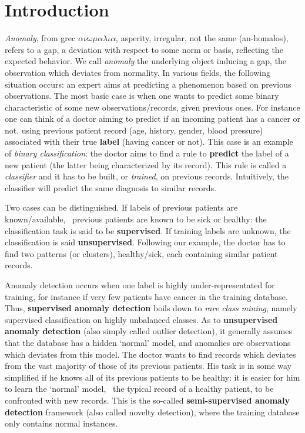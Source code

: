 
\section{Introduction}
\emph{Anomaly}, from grec $\alpha\nu\omega\mu\alpha\lambda\iota\alpha$, asperity, irregular, not the same (an-homalos), refers to a gap, a deviation with respect to some norm or basis, reflecting the expected behavior.
We call \emph{anomaly} the underlying object inducing a gap, the observation which deviates from normality. 
%
In various fields, the following situation occurs: an expert aims at predicting a phenomenon based on previous observations. The most basic case is when one wants to predict some binary characteristic of some new observations/records, given previous ones. For instance one can think of a doctor aiming to predict if an incoming patient has a cancer or not, using previous patient record (age, history, gender, blood pressure) associated with their true \textbf{label} (having cancer or not). This case is an example of \emph{binary classification}: the doctor aims to find a rule to \textbf{predict} the label of a new patient (the latter being characterized by its record). This rule is called a \emph{classifier} and it has to be built, or \emph{trained}, on previous records. %
Intuitively, the classifier will predict the same diagnosis to similar records. 

Two cases can be distinguished. If labels of previous patients are known/available, \ie~previous patients are known to be sick or healthy: the classification task is said to be \textbf{supervised}. If training labels are unknown, the classification is said \textbf{unsupervised}. Following our example, the doctor has to find two patterns (or clusters), healthy/sick, each containing similar patient records.

Anomaly detection occurs when one label is highly under-representated for training, for instance if very few patients have cancer in the training database.
Thus, \textbf{supervised anomaly detection} boils down to \emph{rare class mining}, namely supervised classification on highly unbalanced classes. 
As to \textbf{unsupervised anomaly detection} (also simply called outlier detection), it generally assumes that the database has a hidden `normal' model, and anomalies are observations which deviates from this model. The doctor wants to find records which deviates from the vast majority of those of its previous patients. 
%
His task is in some way simplified if he knows all of its previous patients to be healthy: it is easier for him to learn the `normal' model, \ie~the typical record of a healthy patient, to be confronted with new records. This is the so-called \textbf{semi-supervised anomaly detection} framework (also called novelty detection), where the training database only contains normal instances. 

